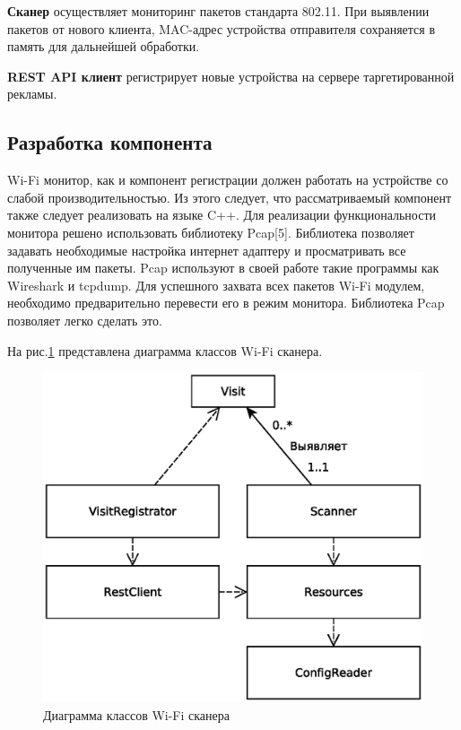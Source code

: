 \textbf{Сканер} осуществляет мониторинг пакетов стандарта 802.11. При выявлении пакетов от нового клиента, MAC-адрес устройства отправителя сохраняется в память для дальнейшей обработки.

\textbf{REST API клиент} регистрирует новые устройства на сервере таргетированной рекламы.

\subsection{Разработка компонента}

Wi-Fi монитор, как и компонент регистрации должен работать на устройстве со слабой производительностью. Из этого следует, что рассматриваемый компонент также следует реализовать на языке C++. Для реализации функциональности монитора решено использовать библиотеку Pcap[5]. Библиотека позволяет задавать необходимые настройка интернет адаптеру и просматривать все полученные им пакеты. Pcap используют в своей работе такие программы как Wireshark и tcpdump. Для успешного захвата всех пакетов Wi-Fi модулем, необходимо предварительно перевести его в режим монитора. Библиотека Pcap позволяет легко сделать это.

На рис.\ref{fig:WiFiScanerUML} представлена диаграмма классов Wi-Fi сканера.

\begin{figure}[h]
	\centering
	\includegraphics[width=\linewidth]{fig/WiFiScanerUML}
	\caption{Диаграмма классов Wi-Fi сканера}
	\label{fig:WiFiScanerUML}
\end{figure}

